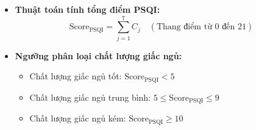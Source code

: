 \documentclass[12pt,a4paper]{article}
\begin{document}
\begin{itemize}
\begin{itemize}
    \end{itemize}
    \item \textbf{Thuật toán tính tổng điểm PSQI:}
    \begin{equation}
        \text{Score}_{\text{PSQI}} = \sum_{j=1}^{7} C_j \quad (\text{Thang điểm từ } 0 \text{ đến } 21)
    \end{equation}
    \item \textbf{Ngưỡng phân loại chất lượng giấc ngủ:}
    \begin{itemize}
        \item Chất lượng giấc ngủ tốt: $\text{Score}_{\text{PSQI}} < 5$
        \item Chất lượng giấc ngủ trung bình: $5 \le \text{Score}_{\text{PSQI}} \le 9$
        \item Chất lượng giấc ngủ kém: $\text{Score}_{\text{PSQI}} \ge 10$
    \end{itemize}
\end{itemize}
\end{document}
